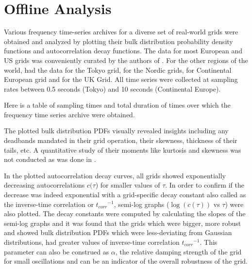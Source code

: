 \section[Offline/Postmortem Analysis]{Offline Analysis}
\label{sec:offline}

Various frequency time-series archives for a diverse set of real-world grids were obtained and analyzed by plotting their bulk distribution probability density functions and autocorrelation decay functions. The data for most European and US grids was conveniently curated by the authors of \cite{lrydin01, lrydinGithub}. For the other regions of the world, \cite{tokyo2017, tokyo2020} had the data for the Tokyo grid, \cite{nordic2018, nordic2019} for the Nordic grids, \cite{ce2019, ce2020} for Continental European grid and \cite{ukNationalGridESOData} for the UK Grid.
All time series were collected at sampling rates between 0.5 seconds (Tokyo) and 10 seconds (Continental Europe).

Here is a table of sampling times and total duration of times over which the frequency time series archive were obtained.

\renewcommand{\arraystretch}{1.0}



The plotted bulk distribution PDFs visually revealed insights including any deadbands \cite{francesca01, vorobev01} mandated in their grid operation, their skewness, thickness of their tails, etc. A quantitative study of their moments like kurtosis and skewness was not conducted as was done in \cite{schafer01}.

In the plotted autocorrelation decay curves, all grids showed exponentially decreasing autocorrelations $c(\tau$) for smaller values of $\tau$. In order to confirm if the decrease was indeed exponential with a grid-specific decay constant also called as the inverse-time correlation or ${t_{corr}}^{-1}$, semi-log graphs ($\log(c(\tau))$ vs $\tau$) were also plotted. The decay constants were computed by calculating the slopes of the semi-log graphs and it was found that the grids which were bigger, more robust and showed bulk distribution PDFs which were less-deviating from Gaussian distributions, had greater values of inverse-time correlation ${t_{corr}}^{-1}$. This parameter can also be construed as $\alpha$, the relative damping strength of the grid for small oscillations and can be an indicator of the overall robustness of the grid.